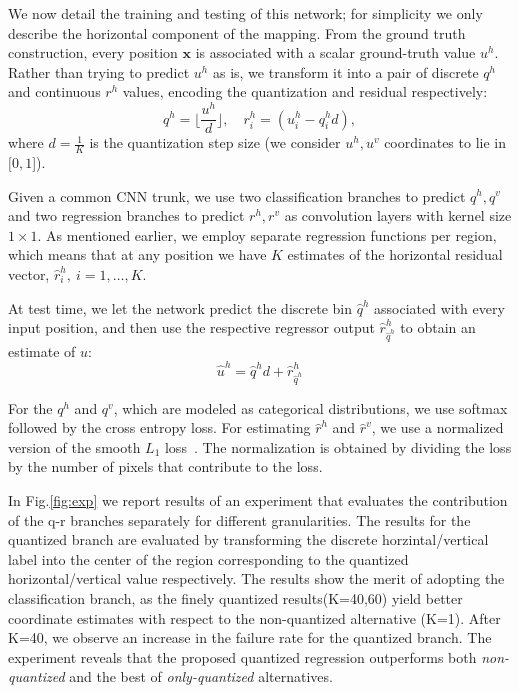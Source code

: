\documentclass[10pt,twocolumn,letterpaper]{article}
\begin{document}
	We now detail the training and testing of this network;  for simplicity we only describe the horizontal component of the mapping. 
	From the ground truth construction, every position $\bm{x}$ is associated with a scalar ground-truth value $u^h$. Rather than trying to predict $u^h$ as is, we transform it into a pair of discrete $q^h$ and continuous $r^h$ values, encoding the quantization and residual respectively:
	\begin{equation} 
	q^h =  \lfloor {\frac{u^h}{d}} \rfloor, \quad  r_i^h =   \left(u^h_i - q^h_i d  \right),
	\end{equation}
	where $d = \frac{1}{K}$ is the quantization step size (we consider $u^h,u^v$ coordinates to lie in $[0,1$]).
	
	Given a common CNN trunk, we use two classification branches to predict $q^h, q^v$ and two regression branches to predict $r^h,r^v$ as convolution layers with kernel size $1\times1$. As mentioned earlier, we employ separate regression functions per region, which means that at any position we have $K$ estimates of the horizontal residual vector, $\hat{r}^h_{i},~i=1,\ldots,K$.
	
	At test time, we let the network predict the discrete bin $\hat{q}^h$ associated with every input position, and then use the respective regressor output $\hat{r}^h_{\hat{q}^h}$ to obtain an estimate of $u$:
	\begin{equation}   
	\hat{u}^h =  \hat{q}^h d + \hat{r}^h_{\hat{q}^h}
	\end{equation}

For the $q^h$ and $q^v$, which are modeled as categorical distributions,  we use  softmax followed by the cross entropy loss. For estimating $\hat{r}^h$ and $\hat{r}^v$, we use a normalized version of the smooth $L_1$ loss~\cite{girshick2015fast}. The normalization is obtained by dividing the loss by the number of pixels that contribute to the loss.

In Fig.\ref{fig:exp} we report results of an experiment that evaluates the contribution of the q-r branches separately for different granularities. The results for the quantized branch are evaluated by transforming the discrete horzintal/vertical label into the center of the region corresponding to the quantized horizontal/vertical value respectively.  The results  show the merit of adopting the classification branch, as the finely quantized results(K=40,60) yield  better coordinate estimates with respect to the non-quantized alternative {(K=1)}. After K=40, we observe an increase in the failure rate for the quantized branch. The experiment reveals that the proposed quantized regression outperforms both \textit{non-quantized} and the best of \textit{only-quantized} alternatives. 
\end{document}
